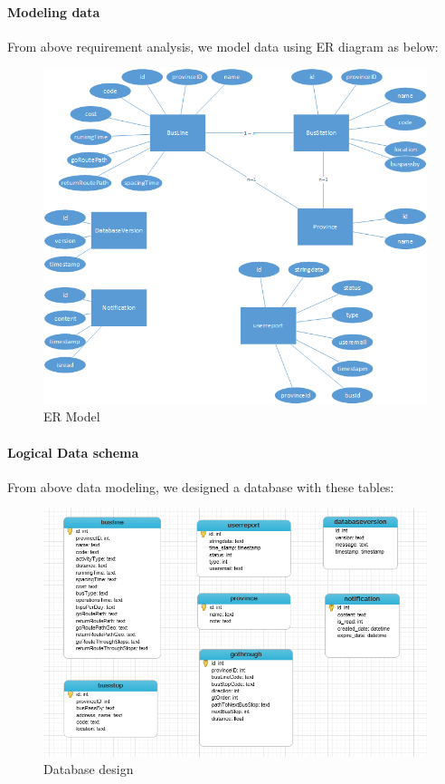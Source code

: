 		\paragraph{Modeling data} 	
			From above requirement analysis, we model data using ER diagram as below:
			\begin{figure}[H]
				\centering
				\includegraphics[scale=5]{Chapters/Fig/ER-model.png}
				\caption{ER Model}
				\label{fig:ER-model}
			\end{figure}
		\paragraph{Logical Data schema} 
			From above data modeling, we designed a database with these tables:
			\begin{figure}[H]
				\centering
				\includegraphics[scale=0.7]{Chapters/Fig/database-design.png}
				\caption{Database design}
				\label{fig:database-design}
			\end{figure}

